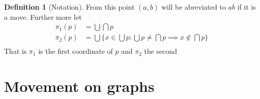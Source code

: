 \documentclass{article}
\theoremstyle{plain}
\theoremstyle{definition}
\newtheorem{definition}[theorem]{Definition}
\begin{document}
\begin{definition}[Notation]\label{def notation}
	From this point $(a,b)$ will be abreviated to $ab$ if it is a
	move. Further more let
	\begin{equation}
	\begin{aligned}
		\pi_1(p) &= \bigcup \bigcap p \\
		\pi_2(p) &= \bigcup \{x \in \bigcup p: \bigcup p \neq
		\bigcap p \implies x \notin \bigcap p\} \\
	\end{aligned}
	\end{equation}
	That is $\pi_1$ is the first coordinate of $p$ and $\pi_2$
	the second
\end{definition}
\section{Movement on graphs}
\end{document}
